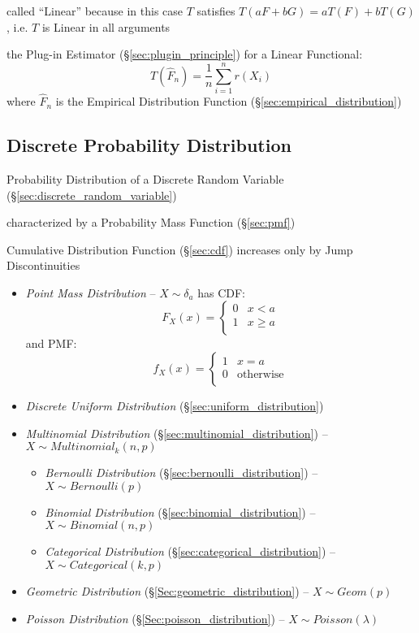 called ``Linear'' because in this case $T$ satisfies
$T(aF + bG) = aT(F) + bT(G)$, i.e. $T$ is Linear in all arguments

the Plug-in Estimator (\S\ref{sec:plugin_principle}) for a Linear Functional:
\[
  T(\hat{F}_n) = \frac{1}{n}\sum_{i=1}^n r(X_i)
\]
where $\hat{F}_n$ is the Empirical Distribution Function
(\S\ref{sec:empirical_distribution})



\subsection{Discrete Probability Distribution}
\label{sec:discrete_probability}

Probability Distribution of a Discrete Random Variable
(\S\ref{sec:discrete_random_variable})

characterized by a Probability Mass Function (\S\ref{sec:pmf})

Cumulative Distribution Function (\S\ref{sec:cdf}) increases only by Jump
Discontinuities

\begin{itemize}
  \item \emph{Point Mass Distribution} -- $X \sim \delta_a$ has CDF:
    \[
      F_X(x) = \begin{cases}
        0 & x <    a \\
        1 & x \geq a \\
      \end{cases}
    \]
    and PMF:
    \[
      f_X(x) = \begin{cases}
        1 & x = a \\
        0 & \text{otherwise} \\
      \end{cases}
    \]
  \item \emph{Discrete Uniform Distribution} (\S\ref{sec:uniform_distribution})
  \item \emph{Multinomial Distribution} (\S\ref{sec:multinomial_distribution})
    -- $X \sim Multinomial_k(n,p)$
  \begin{itemize}
    \item \emph{Bernoulli Distribution} (\S\ref{sec:bernoulli_distribution}) --
      $X \sim Bernoulli(p)$
    \item \emph{Binomial Distribution} (\S\ref{sec:binomial_distribution}) --
      $X \sim Binomial(n,p)$
    \item \emph{Categorical Distribution} (\S\ref{sec:categorical_distribution})
      -- $X \sim Categorical(k,p)$
  \end{itemize}
  \item \emph{Geometric Distribution} (\S\ref{Sec:geometric_distribution}) --
    $X \sim Geom(p)$
  \item \emph{Poisson Distribution} (\S\ref{Sec:poisson_distribution}) --
    $X \sim Poisson(\lambda)$
\end{itemize}



